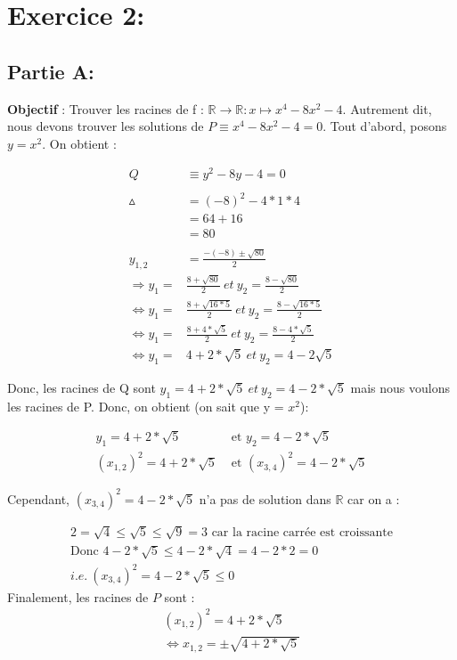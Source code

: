 \documentclass[a4paper, 12pt]{article}
\begin{document}
\newpage

\section{Exercice 2:}

\subsection{Partie A:}

\textbf{Objectif} : Trouver les racines de f : \( \mathbb{R} \rightarrow \mathbb{R} : x \mapsto x^4 - 8x^2 - 4 \).
Autrement dit, nous devons trouver les solutions de \( P \equiv x^4 - 8x^2 - 4 = 0 \). \newline
Tout d'abord, posons \( y = x^2 \).
On obtient :

\begin{align*}
	Q &\equiv y^2 - 8y - 4 = 0\\ \\
	\vartriangle &= (-8)^2 - 4 * 1 * 4 \\
	       &= 64 + 16 \\
	       &= 80 \\ \\
   y_{1,2} &= \frac{-(-8) \pm \sqrt{80}}{2} \\
   \Rightarrow y_1 = &\frac{8 + \sqrt{80}}{2} ~ et ~ y_2 = \frac{8 - \sqrt{80}}{2} \\
   \Leftrightarrow y_1 = &\frac{8 + \sqrt{16 * 5}}{2} ~ et ~ y_2 = \frac{8 - \sqrt{16 * 5}}{2} \\
   \Leftrightarrow y_1 = &\frac{8 + 4 * \sqrt{5}}{2} ~ et ~ y_2 = \frac{8 - 4 * \sqrt{5}}{2} \\
    \Leftrightarrow y_1 = &4 + 2 * \sqrt{5} ~ et ~ y_2 = 4 - 2\sqrt{5}
\end{align*}


Donc, les racines de Q sont \( y_1 = 4 + 2 * \sqrt{5} ~ et ~ y_2 = 4 - 2 * \sqrt{5}  \) mais nous voulons les racines de P. Donc, on obtient (on sait que y = $x^2$):


\begin{align*}
	y_1 = 4 + 2 * \sqrt{5}&\text{ et }y_2 = 4 - 2 * \sqrt{5} \\
	(x_{1,2})^2 = 4 + 2 * \sqrt{5}&\text{ et }(x_{3,4})^2 = 4 - 2 * \sqrt{5}
\end{align*}

	Cependant, $(x_{3,4})^2 = 4 - 2 * \sqrt{5}$ n'a pas de solution dans \( \mathbb{R} \) car on a :

\begin{align*}
	2 = \sqrt{4} \leq \sqrt{5} \leq \sqrt{9} = 3 \text{ car la racine carrée est croissante} \\
	\text{Donc } 4 - 2 * \sqrt{5} \leq 4 - 2 * \sqrt{4} = 4 - 2 * 2 = 0 \\
	i.e. ~ (x_{3,4})^2 = 4 - 2 * \sqrt{5} \leq 0
\end{align*}
Finalement, les racines de $P$ sont : \\
\begin{align*}
	(x_{1,2})^2 = 4 + 2 * \sqrt{5} \\
	\Leftrightarrow x_{1,2} = \pm \sqrt{4 + 2 * \sqrt{5}}
\end{align*}
\end{document}
